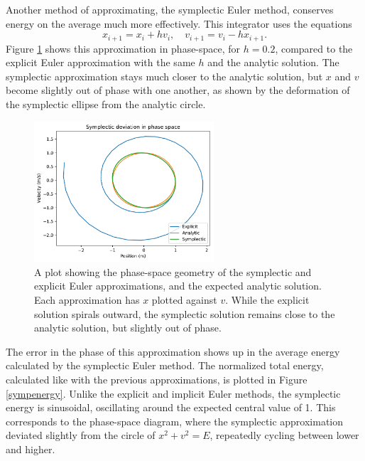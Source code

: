 \documentclass{article}
\begin{document}
Another method of approximating, the symplectic Euler method, conserves energy on the average much more effectively. This integrator uses the equations $$x_{i+1}=x_i+hv_i,\quad v_{i+1}=v_i-hx_{i+1}.$$ Figure \ref{phasesymp} shows this approximation in phase-space, for $h=0.2$, compared to the explicit Euler approximation with the same $h$ and the analytic solution. The symplectic approximation stays much closer to the analytic solution, but $x$ and $v$ become slightly out of phase with one another, as shown by the deformation of the symplectic ellipse from the analytic circle. 

\begin{figure}[H]
	\centering
	\includegraphics[width=0.6\textwidth]{eulerphasesymp.pdf}
	\caption{A plot showing the phase-space geometry of the symplectic and explicit Euler approximations, and the expected analytic solution. Each approximation has $x$ plotted against $v$. While the explicit solution spirals outward, the symplectic solution remains close to the analytic solution, but slightly out of phase.}
	\label{phasesymp}
\end{figure}

The error in the phase of this approximation shows up in the average energy calculated by the symplectic Euler method. The normalized total energy, calculated like with the previous approximations, is plotted in Figure \ref{sympenergy}. Unlike the explicit and implicit Euler methods, the symplectic energy is sinusoidal, oscillating around the expected central value of 1. This corresponds to the phase-space diagram, where the symplectic approximation deviated slightly from the circle of $x^2+v^2=E$, repeatedly cycling between lower and higher. 
\end{document}
